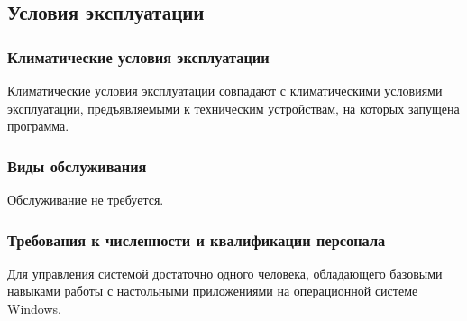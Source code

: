 \subsection{Условия эксплуатации}

\subsubsection{Климатические условия эксплуатации}

Климатические условия эксплуатации совпадают с климатическими условиями эксплуатации, предъявляемыми к техническим устройствам, на которых запущена программа.

\subsubsection{Виды обслуживания}

Обслуживание не требуется. 

\subsubsection{Требования к численности и квалификации персонала}

Для управления системой достаточно одного человека, обладающего базовыми навыками работы с настольными приложениями на операционной системе Windows.